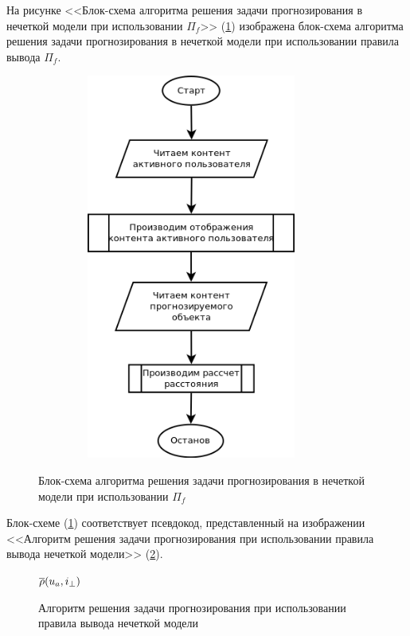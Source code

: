 На рисунке <<Блок-схема алгоритма решения задачи прогнозирования в нечеткой модели при
	использовании $\Pi_f$>> (\ref{dia:fuz-p}) изображена блок-схема алгоритма
решения задачи прогнозирования  в нечеткой модели при использовании
правила вывода $\Pi_f$.
\begin{figure}[hbtp]
	\caption{Блок-схема алгоритма решения задачи прогнозирования в нечеткой модели при
	использовании $\Pi_f$}
\begin{center}
	\label{dia:fuz-p}
 \includegraphics[width=4in,height=5in]{pics/algs/fuz-p.png}
\end{center}
\end{figure}
Блок-схеме (\ref{dia:fuz-p}) соответствует псевдокод, представленный на
изображении <<Алгоритм решения задачи прогнозирования при использовании правила
	вывода нечеткой модели>> (\ref{alg:fuz-p}).

\begin{figure}[htb]
	\caption{Алгоритм решения задачи прогнозирования при использовании правила
	вывода нечеткой модели}
	\label{alg:fuz-p}
		\begin{algorithmic}[1]
			\State $\overline{\rho}(u_a, i_{\bot})$ 
		\end{algorithmic}
\end{figure}

